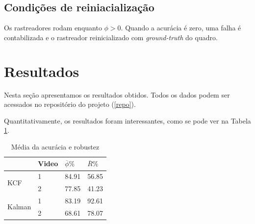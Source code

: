 \documentclass[conference]{IEEEtran}
\begin{document}
\subsection{Condições de reiniacialização}
Os rastreadores rodam enquanto $\phi > 0$. Quando a acurácia é zero, uma falha é contabilizada e o rastreador reinicializado com \textit{ground-truth} do quadro.

\section{Resultados}
Nesta seção apresentamos os resultados obtidos. Todos os dados podem ser acessados no repositório do projeto (\ref{repo}).

Quantitativamente, os resultados foram interessantes, como se pode ver na Tabela \ref{tabela}.


\begin{table}[]
\centering
\caption{Média da acurácia e robustez}
\label{tabela}
\begin{tabular}{@{}llll@{}}
\toprule
 & Video & $\overline{\phi}\%$ & $\overline{R}\%$ \\ \midrule
\multicolumn{1}{l}{\multirow{2}{*}{KCF}} & \multicolumn{1}{l}{1} & \multicolumn{1}{l}{84.91} & \multicolumn{1}{l}{56.85} \\ \cmidrule(l){2-4} 
\multicolumn{1}{l}{} & \multicolumn{1}{l}{2} & \multicolumn{1}{l}{77.85} & \multicolumn{1}{l}{41.23} \\ \midrule
\multicolumn{1}{l}{\multirow{2}{*}{Kalman}} & \multicolumn{1}{l}{1} & \multicolumn{1}{l}{83.19} & \multicolumn{1}{l}{92.61} \\ \cmidrule(l){2-4} 
\multicolumn{1}{l}{} & \multicolumn{1}{l}{2} & \multicolumn{1}{l}{68.61} & \multicolumn{1}{l}{78.07} \\ \bottomrule
\end{tabular}
\end{table}
\end{document}
